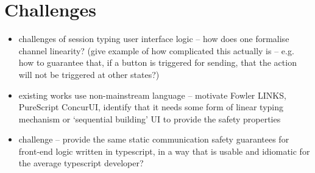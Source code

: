 \section{Challenges}
\begin{itemize}
\item challenges of session typing user interface logic -- how does one formalise channel linearity? (give example of how complicated this actually is -- e.g. how to guarantee that, if a button is triggered for sending, that the action will not be triggered at other states?)
\item existing works use non-mainstream language -- motivate Fowler LINKS, PureScript ConcurUI, identify that it needs some form of linear typing mechanism or `sequential building' UI to provide the safety properties
\item challenge -- provide the same static communication safety guarantees for front-end logic written in typescript, in a way that is usable and idiomatic for the average typescript developer?
\end{itemize}